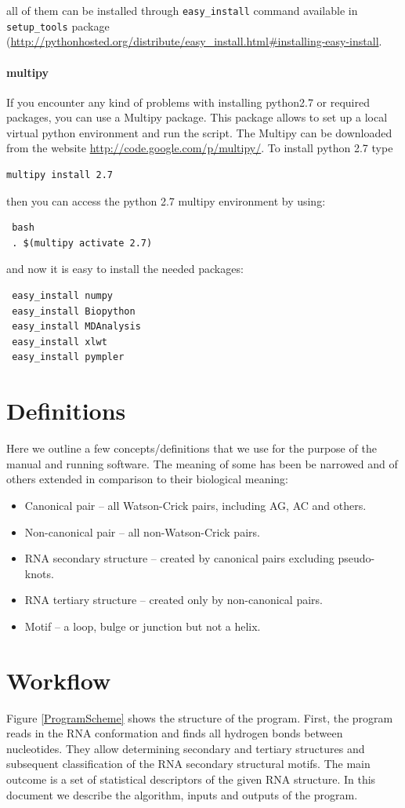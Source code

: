 \documentclass[12pt]{article}
\begin{document}
all of them can be installed through \texttt{easy\_install} command available in \texttt{setup\_tools} package (\url{http://pythonhosted.org/distribute/easy_install.html#installing-easy-install}. 

\paragraph{multipy}
If you encounter any kind of problems with installing python2.7 or required packages, you can use a Multipy package. This package allows to set up a local virtual python environment and run the script. The Multipy can be downloaded from the website \url{http://code.google.com/p/multipy/}.  To install python 2.7 type 
\begin{verbatim}
multipy install 2.7
\end{verbatim}
then you can access the python 2.7 multipy environment  by using:
\begin{verbatim}
 bash
 . $(multipy activate 2.7)
\end{verbatim}
and now it is easy to install the needed packages: 
\begin{verbatim}
 easy_install numpy  
 easy_install Biopython
 easy_install MDAnalysis
 easy_install xlwt
 easy_install pympler
\end{verbatim}

\section{Definitions}
Here we outline a few concepts/definitions that we use for the purpose of the manual and running software. The meaning of some has been be narrowed and of others extended in comparison to their biological meaning: 
\begin{itemize} 
\item Canonical pair -- all Watson-Crick pairs, including AG, AC and others.
\item Non-canonical pair -- all non-Watson-Crick pairs.
\item RNA secondary structure -- created by canonical pairs excluding pseudo-knots.
\item RNA tertiary structure -- created only by non-canonical pairs.
\item Motif -- a loop, bulge or junction but not a helix. 
\end{itemize}

\section{Workflow}
Figure \ref{ProgramScheme} shows the structure of the program. First, the program reads in the RNA conformation and finds all hydrogen bonds between nucleotides. They allow determining secondary and tertiary structures and subsequent classification of the RNA secondary structural motifs. The main outcome is a set of statistical descriptors of the given RNA structure. In this document we  describe the algorithm, inputs and outputs of the program. 
\end{document}
